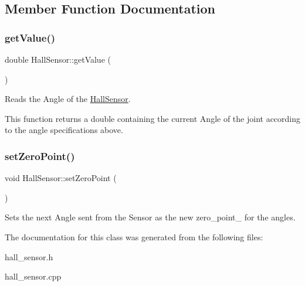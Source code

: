\subsection{Member Function Documentation}
\mbox{\label{classHallSensor_a5eea1969e798bc786c5fa165aeb47c77}} 
\subsubsection{\texorpdfstring{get\+Value()}{getValue()}}
{\footnotesize\ttfamily double Hall\+Sensor\+::get\+Value (\begin{DoxyParamCaption}{ }\end{DoxyParamCaption})}



Reads the Angle of the \hyperlink{classHallSensor}{Hall\+Sensor}. 

This function returns a double containing the current Angle of the joint according to the angle specifications above. \mbox{\label{classHallSensor_ac97079734e670ba56401e6a8b37144e8}} 
\subsubsection{\texorpdfstring{set\+Zero\+Point()}{setZeroPoint()}}
{\footnotesize\ttfamily void Hall\+Sensor\+::set\+Zero\+Point (\begin{DoxyParamCaption}{ }\end{DoxyParamCaption})}

Sets the next Angle sent from the Sensor as the new zero\+\_\+point\+\_\+ for the angles. 

The documentation for this class was generated from the following files\+:\begin{DoxyCompactItemize}
\item 
hall\+\_\+sensor.\+h\item 
hall\+\_\+sensor.\+cpp\end{DoxyCompactItemize}
